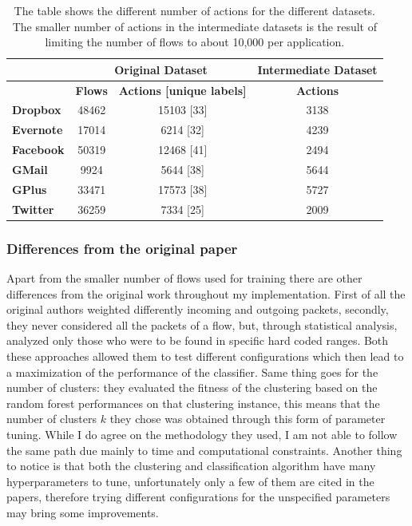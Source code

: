 \begin{table}[!h]
\centering
\begin{tabular}{|l|c|c|c|}
\hline
      & \multicolumn{2}{c|}{Original Dataset} & Intermediate Dataset \\ \hline
         & \textbf{Flows}    & \textbf{Actions [unique labels]}    & \textbf{Actions}              \\ \hline
\textbf{Dropbox}  & 48462    & 15103 [33]                 & 3138                 \\ \hline
\textbf{Evernote} & 17014    & 6214 [32]                  & 4239                 \\ \hline
\textbf{Facebook} & 50319    & 12468 [41]                 & 2494                 \\ \hline
\textbf{GMail}    & 9924     & 5644 [38]                  & 5644                 \\ \hline
\textbf{GPlus}    & 33471    & 17573 [38]                 & 5727                 \\ \hline
\textbf{Twitter}  & 36259    & 7334 [25]                  & 2009                 \\ \hline
\end{tabular}
\caption{\small{The table shows the different number of actions for the different datasets. The smaller number of actions in the intermediate datasets is the result of limiting the number of flows to about 10,000 per application.}}
\label{tab:datasetdata}
\end{table}


\subsubsection{Differences from the original paper}
Apart from the smaller number of flows used for training there are other differences from the original work throughout my implementation. First of all the original authors weighted differently incoming and outgoing packets, secondly, they never considered all the packets of a flow, but, through statistical analysis, analyzed only those who were to be found in specific hard coded ranges. Both these approaches allowed them to test different configurations which then lead to a maximization of the performance of the classifier. Same thing goes for the number of clusters: they evaluated the fitness of the clustering based on the random forest performances on that clustering instance, this means that the number of clusters $k$ they chose was obtained through this form of parameter tuning. While I do agree on the methodology they used, I am not able to follow the same path due mainly to time and computational constraints. Another thing to notice is that both the clustering and classification algorithm have many hyperparameters to tune, unfortunately only a few of them are cited in the papers, therefore trying different configurations for the unspecified parameters may bring some improvements.

